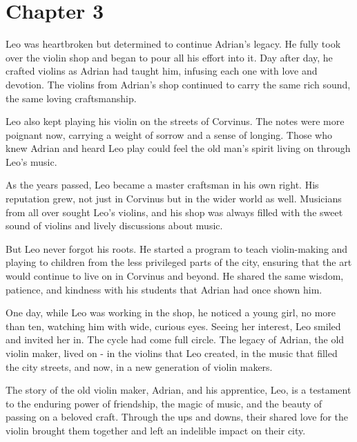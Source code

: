 \section{Chapter 3}
Leo was heartbroken but determined to continue Adrian's legacy. He fully took over the violin shop and began to pour all his effort into it. Day after day, he crafted violins as Adrian had taught him, infusing each one with love and devotion. The violins from Adrian’s shop continued to carry the same rich sound, the same loving craftsmanship.

Leo also kept playing his violin on the streets of Corvinus. The notes were more poignant now, carrying a weight of sorrow and a sense of longing. Those who knew Adrian and heard Leo play could feel the old man's spirit living on through Leo's music.

As the years passed, Leo became a master craftsman in his own right. His reputation grew, not just in Corvinus but in the wider world as well. Musicians from all over sought Leo’s violins, and his shop was always filled with the sweet sound of violins and lively discussions about music.

But Leo never forgot his roots. He started a program to teach violin-making and playing to children from the less privileged parts of the city, ensuring that the art would continue to live on in Corvinus and beyond. He shared the same wisdom, patience, and kindness with his students that Adrian had once shown him.

One day, while Leo was working in the shop, he noticed a young girl, no more than ten, watching him with wide, curious eyes. Seeing her interest, Leo smiled and invited her in. The cycle had come full circle. The legacy of Adrian, the old violin maker, lived on - in the violins that Leo created, in the music that filled the city streets, and now, in a new generation of violin makers.

The story of the old violin maker, Adrian, and his apprentice, Leo, is a testament to the enduring power of friendship, the magic of music, and the beauty of passing on a beloved craft. Through the ups and downs, their shared love for the violin brought them together and left an indelible impact on their city.
